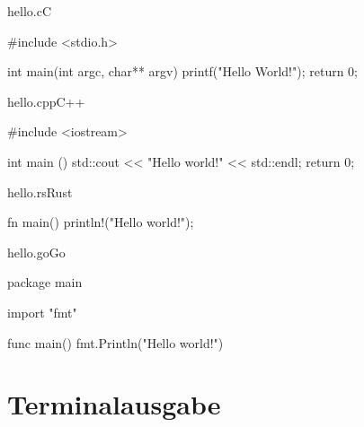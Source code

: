 \begin{codeblock}{hello.c}{C}
  \begin{ccode}
    #include <stdio.h>
    
    int main(int argc, char** argv) {
      printf("Hello World!\n");
      return 0;
    }
  \end{ccode}
\end{codeblock}

\begin{codeblock}{hello.cpp}{C++}
  \begin{cppcode}
    #include <iostream>
    
    int main () {
      std::cout << "Hello world!" << std::endl;
      return 0;
    }
  \end{cppcode}
\end{codeblock}

\begin{codeblock}{hello.rs}{Rust}
  \begin{rustcode}
    fn main() {
      println!("Hello world!");
    }
  \end{rustcode}
\end{codeblock}

\begin{codeblock}{hello.go}{Go}
  \begin{gocode}
    package main
    
    import "fmt"
    
    func main() { fmt.Println("Hello world!") }
  \end{gocode}
\end{codeblock}

\section{Terminalausgabe}

\begin{terminalblock}
\end{terminalblock}








% 
% 
